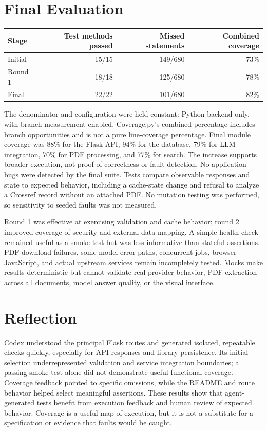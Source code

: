 \documentclass[10pt]{article}
\begin{document}
\section{Final Evaluation}
\begin{center}\begin{tabular}{lrrr}\toprule
Stage & Test methods passed & Missed statements & Combined coverage\\\midrule
Initial & 15/15 & 149/680 & 73\%\\
Round 1 & 18/18 & 125/680 & 78\%\\
Final & 22/22 & 101/680 & 82\%\\\bottomrule\end{tabular}\end{center}
The denominator and configuration were held constant: Python backend only, with branch measurement enabled. Coverage.py's combined percentage includes branch opportunities and is not a pure line-coverage percentage. Final module coverage was 88\% for the Flask API, 94\% for the database, 79\% for LLM integration, 70\% for PDF processing, and 77\% for search. The increase supports broader execution, not proof of correctness or fault detection. No application bugs were detected by the final suite. Tests compare observable responses and state to expected behavior, including a cache-state change and refusal to analyze a Crossref record without an attached PDF. No mutation testing was performed, so sensitivity to seeded faults was not measured.

Round 1 was effective at exercising validation and cache behavior; round 2 improved coverage of security and external data mapping. A simple health check remained useful as a smoke test but was less informative than stateful assertions. PDF download failures, some model error paths, concurrent jobs, browser JavaScript, and actual upstream services remain incompletely tested. Mocks make results deterministic but cannot validate real provider behavior, PDF extraction across all documents, model answer quality, or the visual interface.

\section{Reflection}
Codex understood the principal Flask routes and generated isolated, repeatable checks quickly, especially for API responses and library persistence. Its initial selection underrepresented validation and service integration boundaries; a passing smoke test alone did not demonstrate useful functional coverage. Coverage feedback pointed to specific omissions, while the README and route behavior helped select meaningful assertions. These results show that agent-generated tests benefit from execution feedback and human review of expected behavior. Coverage is a useful map of execution, but it is not a substitute for a specification or evidence that faults would be caught.
\end{document}

